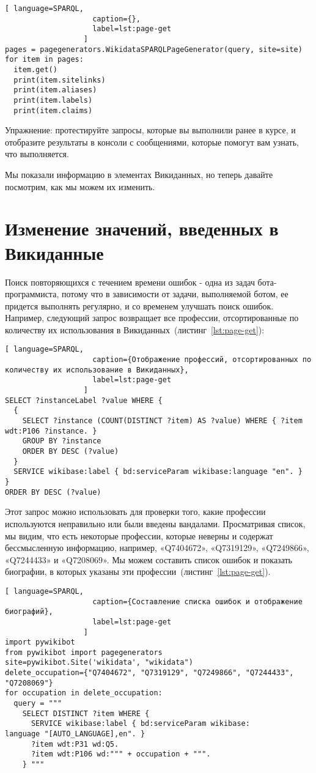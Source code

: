 {\begin{lstlisting}[ language=SPARQL,
                    caption={},
                    label=lst:page-get
                  ]
pages = pagegenerators.WikidataSPARQLPageGenerator(query, site=site)
for item in pages:
  item.get()
  print(item.sitelinks)
  print(item.aliases)
  print(item.labels)
  print(item.claims)
\end{lstlisting} 

Упражнение: протестируйте запросы, которые вы выполнили ранее в курсе, и отобразите результаты в консоли с сообщениями, которые помогут вам узнать, что выполняется.

Мы показали информацию в элементах Викиданных, но теперь давайте посмотрим, как мы можем их изменить.

\section{Изменение значений, введенных в Викиданные}
\label{sec:modifying the values entered in Wikidata}

Поиск повторяющихся с течением времени ошибок - одна из задач бота-программиста, потому что в зависимости от задачи, выполняемой ботом, ее придется выполнять регулярно, и со временем улучшать поиск ошибок. Например, следующий запрос возвращает все профессии, отсортированные по количеству их использования в Викиданных~(листинг~\ref{lst:page-get}):

\begin{lstlisting}[ language=SPARQL,
                    caption={Отображение профессий, отсортированных по количеству их использование в Викиданных},
                    label=lst:page-get
                  ]
SELECT ?instanceLabel ?value WHERE {
  {
    SELECT ?instance (COUNT(DISTINCT ?item) AS ?value) WHERE { ?item
wdt:P106 ?instance. }
    GROUP BY ?instance
    ORDER BY DESC (?value)
  }
  SERVICE wikibase:label { bd:serviceParam wikibase:language "en". }
}
ORDER BY DESC (?value)
\end{lstlisting} 

Этот запрос можно использовать для проверки того, какие профессии используются неправильно или были введены вандалами. Просматривая список, мы видим, что есть некоторые профессии, которые неверны и содержат бессмысленную информацию, например, «Q7404672», «Q7319129», «Q7249866», «Q7244433» и «Q7208069». Мы можем составить список ошибок и показать биографии, в которых указаны эти профессии~(листинг~\ref{lst:page-get}).

\begin{lstlisting}[ language=SPARQL,
                    caption={Составление списка ошибок и отображение биографий},
                    label=lst:page-get
                  ]
import pywikibot
from pywikibot import pagegenerators
site=pywikibot.Site('wikidata', "wikidata")
delete_occupation={"Q7404672", "Q7319129", "Q7249866", "Q7244433", 
"Q7208069"}
for occupation in delete_occupation:
  query = """
    SELECT DISTINCT ?item WHERE {
      SERVICE wikibase:label { bd:serviceParam wikibase:
language "[AUTO_LANGUAGE],en". }
      ?item wdt:P31 wd:Q5.
      ?item wdt:P106 wd:""" + occupation + """.
    } """


\end{lstlisting}}
